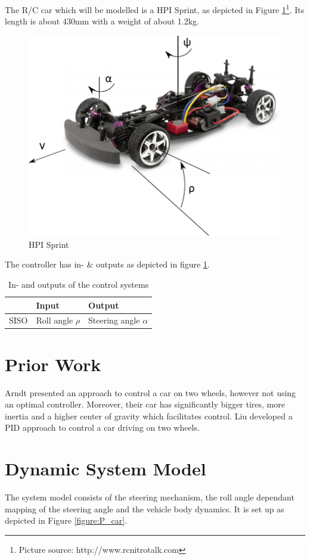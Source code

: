 \documentclass[conference]{IEEEtran}
\begin{document}
The R/C car which will be modelled is a HPI Sprint, as depicted in Figure \ref{figure:hpi_sprint}\footnote{Picture source: http://www.rcnitrotalk.com}. Its length is about 430mm with a weight of about 1.2kg. 

\begin{figure}[h!]
\centering
  \includegraphics[width=.3\textwidth]{pics/hpisprintgeom.pdf} 
  \caption{HPI Sprint}  
  \label{figure:hpi_sprint}
\end{figure}

The controller has in- \& outputs as depicted in figure \ref{figure:controlinout}. 

\begin{table}[h]
\begin{center}
\begin{tabular}{|l||l|l|}
\hline
 		& Input 		& Output\\
\hline
SISO 	& Roll angle $\rho$ 	& Steering angle $\alpha$\\
\hline
\end{tabular}
\caption{In- and outputs of the control systems}  
\label{figure:controlinout}
\end{center}
\end{table}


\section{Prior Work}

Arndt \cite{bib:arndt} presented an approach to control a car on two wheels, however not using an optimal controller. Moreover, their car has significantly bigger tires, more inertia and a higher center of gravity which facilitates control. Liu \cite{bib:liu} developed a PID approach to control a car driving on two wheels.

\section{Dynamic System Model}

The system model consists of the steering mechanism, the roll angle dependant mapping of the steering angle and the vehicle body dynamics. It is set up as depicted in Figure \ref{figure:P_car}. 
\end{document}

